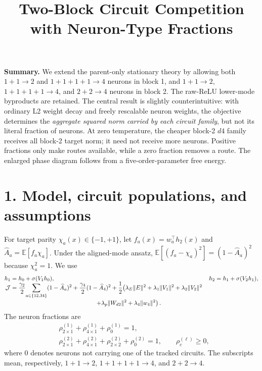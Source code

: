 \documentclass[10pt]{article}
\title{\vspace{-1.3cm}\textbf{Two-Block Circuit Competition with Neuron-Type Fractions}}
\author{}
\date{\vspace{-1.15cm}}
\begin{document}
\maketitle
\vspace{-0.75cm}

\textbf{Summary.}
We extend the parent-only stationary theory by allowing both $1+1\to2$ and
$1+1+1+1\to4$ neurons in block 1, and $1+1\to2$, $1+1+1+1\to4$, and
$2+2\to4$ neurons in block 2.  The raw-ReLU lower-mode byproducts are retained.  The central
result is slightly counterintuitive: with ordinary L2 weight decay and freely rescalable neuron
weights, the objective determines the \emph{aggregate squared norm carried by each circuit
family}, but not its literal fraction of neurons.  At zero temperature, the cheaper block-2
$d4$ family receives all block-2 target norm; it need not receive more neurons.  Positive
fractions only make routes available, while a zero fraction removes a route.  The enlarged
phase diagram follows from a five-order-parameter free energy.

\section*{1. Model, circuit populations, and assumptions}
For target parity $\chi_a(x)\in\{-1,+1\}$, let $f_a(x)=w_a^\top h_2(x)$ and
$\widehat A_a=\mathbb E[f_a\chi_a]$.  Under the aligned-mode ansatz,
$\mathbb E[(f_a-\chi_a)^2]=(1-\widehat A_a)^2$ because $\chi_a^2=1$.  We use
\begin{align}
h_1&=h_0+\sigma(V_1h_0),& h_2&=h_1+\sigma(V_2h_1),\nonumber\\[-5pt]
\mathcal J&=\frac{\gamma_2}{2}\!\sum_{a\in\{12,34\}}(1-\widehat A_a)^2
+\frac{\gamma_4}{2}(1-\widehat A_4)^2
+\frac12\!\left(\lambda_E\|E\|^2+\lambda_1\|V_1\|^2+\lambda_2\|V_2\|^2\right.\nonumber\\[-2pt]
&\hspace{5.0cm}\left.+\lambda_p\|W_{d2}\|^2+\lambda_4\|w_4\|^2\right).
\label{eq:objective}
\end{align}
The neuron fractions are
\begin{align}
&\rho^{(1)}_{2\times1}+\rho^{(1)}_{4\times1}+\rho^{(1)}_0=1,\nonumber\\[-2pt]
&\rho^{(2)}_{2\times1}+\rho^{(2)}_{4\times1}
+\rho^{(2)}_{2\times2}+\rho^{(2)}_0=1,
\qquad \rho^{(\ell)}_c\geq0,
\label{eq:fractions}
\end{align}
where $0$ denotes neurons not carrying one of the tracked circuits.  The subscripts mean,
respectively, $1+1\to2$, $1+1+1+1\to4$, and $2+2\to4$.
\end{document}
